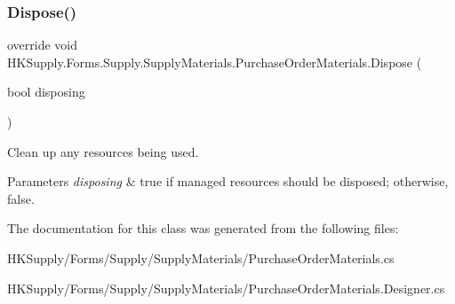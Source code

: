 \subsubsection{\texorpdfstring{Dispose()}{Dispose()}}
{\footnotesize\ttfamily override void H\+K\+Supply.\+Forms.\+Supply.\+Supply\+Materials.\+Purchase\+Order\+Materials.\+Dispose (\begin{DoxyParamCaption}\item[{bool}]{disposing }\end{DoxyParamCaption})\hspace{0.3cm}{\ttfamily [protected]}}



Clean up any resources being used. 


\begin{DoxyParams}{Parameters}
{\em disposing} & true if managed resources should be disposed; otherwise, false.\\
\hline
\end{DoxyParams}


The documentation for this class was generated from the following files\+:\begin{DoxyCompactItemize}
\item 
H\+K\+Supply/\+Forms/\+Supply/\+Supply\+Materials/Purchase\+Order\+Materials.\+cs\item 
H\+K\+Supply/\+Forms/\+Supply/\+Supply\+Materials/Purchase\+Order\+Materials.\+Designer.\+cs\end{DoxyCompactItemize}
